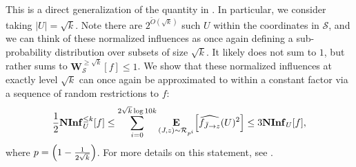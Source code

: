 \documentclass[10pt,a4paper]{article}
\theoremstyle{plain}
\theoremstyle{remark}
\theoremstyle{plain}
\providecommand{\E}{}
\renewcommand{\E}{\mathop{\bf E\/}}
\newcommand{\bigbracket}[1]{\Bigl [ #1 \Bigr ]}
\newcommand{\bigparen}[1]{\Bigl ( #1 \Bigr )}
\providecommand{\W}{}
\renewcommand{\W}{\mathbf{W}}
\newcommand\NormInf{{\mathbf{NInf}}}
\renewcommand{\hat}{\widehat}
\renewcommand{\tilde}{\widetilde}
\newcommand{\calR}{\mathcal{R}}
\newcommand{\calS}{\mathcal{S}}
\newcommand{\InfluentialCoords}{\calS}
\newcommand{\Restrictedf}{f_{\bar{J}\to z}}
\begin{document}
This is a direct generalization of the quantity in . In particular, we consider taking $|U| = \sqrt{k}$. Note there are $2^{\tilde{O}(\sqrt{k})}$ such $U$ within the coordinates in $\InfluentialCoords$, and we can think of these normalized influences as once again defining a sub-probability distribution over subsets of size $\sqrt{k}$. It likely does not sum to $1$, but rather sums to $\W_\InfluentialCoords^{\geq \sqrt{k}}[f] \leq 1$. We show that these normalized influences at exactly level $\sqrt{k}$ can once again be approximated to within a constant factor via a sequence of random restrictions to $f$:
$$\frac{1}{2}\NormInf_U^{\leq k}[f] \leq \sum_{i=0}^{2\sqrt{k}\log 10k} \E_{(J,z) \sim \calR_{p^i}}\bigbracket{\hat{\Restrictedf}(U)^2} \leq 3\NormInf_U[f],$$
where $p = \bigparen{1-\frac{1}{2\sqrt{k}}}$. For more details on this statement, see .

 
\end{document}
